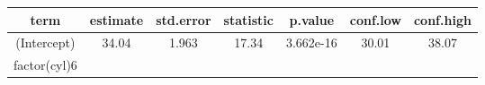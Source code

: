 \documentclass[]{article}
\theoremstyle{definition}
\theoremstyle{definition}
\theoremstyle{definition}
\theoremstyle{remark}
\begin{document}
\begin{longtable}[]{@{}ccccccc@{}}
\toprule
\begin{minipage}[b]{0.14\columnwidth}\centering\strut
term\strut
\end{minipage} & \begin{minipage}[b]{0.11\columnwidth}\centering\strut
estimate\strut
\end{minipage} & \begin{minipage}[b]{0.12\columnwidth}\centering\strut
std.error\strut
\end{minipage} & \begin{minipage}[b]{0.12\columnwidth}\centering\strut
statistic\strut
\end{minipage} & \begin{minipage}[b]{0.12\columnwidth}\centering\strut
p.value\strut
\end{minipage} & \begin{minipage}[b]{0.11\columnwidth}\centering\strut
conf.low\strut
\end{minipage} & \begin{minipage}[b]{0.11\columnwidth}\centering\strut
conf.high\strut
\end{minipage}\tabularnewline
\midrule
\endhead
\begin{minipage}[t]{0.14\columnwidth}\centering\strut
(Intercept)\strut
\end{minipage} & \begin{minipage}[t]{0.11\columnwidth}\centering\strut
34.04\strut
\end{minipage} & \begin{minipage}[t]{0.12\columnwidth}\centering\strut
1.963\strut
\end{minipage} & \begin{minipage}[t]{0.12\columnwidth}\centering\strut
17.34\strut
\end{minipage} & \begin{minipage}[t]{0.12\columnwidth}\centering\strut
3.662e-16\strut
\end{minipage} & \begin{minipage}[t]{0.11\columnwidth}\centering\strut
30.01\strut
\end{minipage} & \begin{minipage}[t]{0.11\columnwidth}\centering\strut
38.07\strut
\end{minipage}\tabularnewline
\begin{minipage}[t]{0.14\columnwidth}\centering\strut
factor(cyl)6\strut
\end{minipage} & \begin{minipage}[t]{0.11\columnwidth}\centering\strut

\end{minipage}
\end{longtable}
\end{document}
